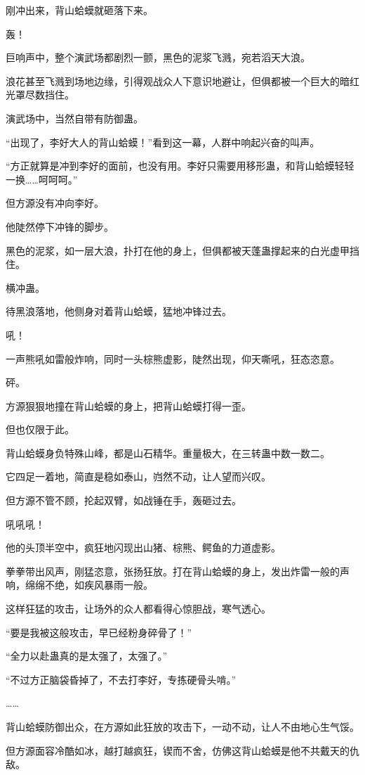 \begin{this_body}
刚冲出来，背山蛤蟆就砸落下来。

轰！

巨响声中，整个演武场都剧烈一颤，黑色的泥浆飞溅，宛若滔天大浪。

浪花甚至飞溅到场地边缘，引得观战众人下意识地避让，但俱都被一个巨大的暗红光罩尽数挡住。

演武场中，当然自带有防御蛊。

“出现了，李好大人的背山蛤蟆！”看到这一幕，人群中响起兴奋的叫声。

“方正就算是冲到李好的面前，也没有用。李好只需要用移形蛊，和背山蛤蟆轻轻一换……呵呵呵。”

但方源没有冲向李好。

他陡然停下冲锋的脚步。

黑色的泥浆，如一层大浪，扑打在他的身上，但俱都被天蓬蛊撑起来的白光虚甲挡住。

横冲蛊。

待黑浪落地，他侧身对着背山蛤蟆，猛地冲锋过去。

吼！

一声熊吼如雷般炸响，同时一头棕熊虚影，陡然出现，仰天嘶吼，狂态恣意。

砰。

方源狠狠地撞在背山蛤蟆的身上，把背山蛤蟆打得一歪。

但也仅限于此。

背山蛤蟆身负特殊山峰，都是山石精华。重量极大，在三转蛊中数一数二。

它四足一着地，简直是稳如泰山，岿然不动，让人望而兴叹。

但方源不管不顾，抡起双臂，如战锤在手，轰砸过去。

吼吼吼！

他的头顶半空中，疯狂地闪现出山猪、棕熊、鳄鱼的力道虚影。

拳拳带出风声，刚猛恣意，张扬狂放。打在背山蛤蟆的身上，发出炸雷一般的声响，绵绵不绝，如疾风暴雨一般。

这样狂猛的攻击，让场外的众人都看得心惊胆战，寒气透心。

“要是我被这般攻击，早已经粉身碎骨了！”

“全力以赴蛊真的是太强了，太强了。”

“不过方正脑袋昏掉了，不去打李好，专拣硬骨头啃。”

……

背山蛤蟆防御出众，在方源如此狂放的攻击下，一动不动，让人不由地心生气馁。

但方源面容冷酷如冰，越打越疯狂，锲而不舍，仿佛这背山蛤蟆是他不共戴天的仇敌。


\end{this_body}
